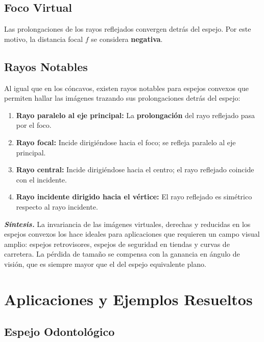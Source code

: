 \documentclass[12pt, a4paper]{article}
\theoremstyle{definition}
\begin{document}
\subsection{Foco Virtual}

Las prolongaciones de los rayos reflejados convergen detrás del espejo. Por este motivo, la distancia focal \(f\) se considera \textbf{negativa}.

\subsection{Rayos Notables}

Al igual que en los cóncavos, existen rayos notables para espejos convexos que permiten hallar las imágenes trazando sus prolongaciones detrás del espejo:

\begin{enumerate}
  \item \textbf{Rayo paralelo al eje principal:} La \textbf{prolongación} del rayo reflejado pasa por el foco.
  \item \textbf{Rayo focal:} Incide dirigiéndose hacia el foco; se refleja paralelo al eje principal.
  \item \textbf{Rayo central:} Incide dirigiéndose hacia el centro; el rayo reflejado coincide con el incidente.
  \item \textbf{Rayo incidente dirigido hacia el vértice:} El rayo reflejado es simétrico respecto al rayo incidente.
\end{enumerate}

\textit{\textbf{Síntesis.}} La invariancia de las imágenes virtuales, derechas y reducidas en los espejos convexos los hace ideales para aplicaciones que requieren un campo visual amplio: espejos retrovisores, espejos de seguridad en tiendas y curvas de carretera. La pérdida de tamaño se compensa con la ganancia en ángulo de visión, que es siempre mayor que el del espejo equivalente plano.

\section{Aplicaciones y Ejemplos Resueltos}

\subsection{Espejo Odontológico}
\end{document}
